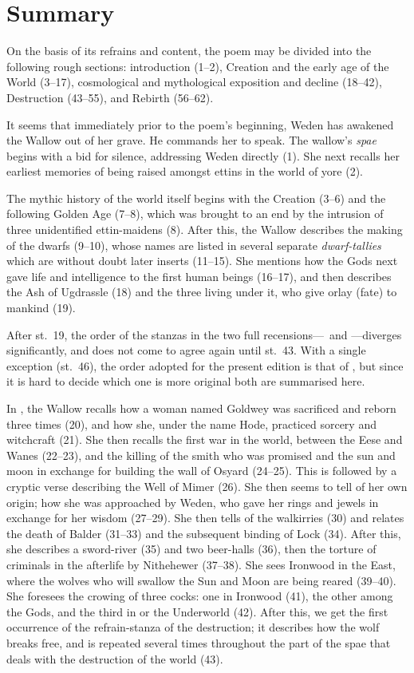 \section{Summary}

On the basis of its refrains and content, the poem may be divided into the following rough sections: introduction (1--2), Creation and the early age of the World (3--17), cosmological and mythological exposition and decline (18--42), Destruction (43--55), and Rebirth (56--62).

It seems that immediately prior to the poem’s beginning, Weden has awakened the Wallow out of her grave.  He commands her to speak.  The wallow’s \emph{spae} begins with a bid for silence, addressing Weden directly (1).  She next recalls her earliest memories of being raised amongst ettins in the world of yore (2).

The mythic history of the world itself begins with the Creation (3--6) and the following Golden Age (7--8), which was brought to an end by the intrusion of three unidentified ettin-maidens (8).  After this, the Wallow describes the making of the dwarfs (9--10), whose names are listed in several separate \emph{dwarf-tallies} which are without doubt later inserts (11--15).  She mentions how the Gods next gave life and intelligence to the first human beings (16--17), and then describes the Ash of Ugdrassle (18) and the three  living under it, who give orlay (fate) to mankind (19).

After st.~19, the order of the stanzas in the two full recensions---\Regius\ and \Hauksbok---diverges significantly, and does not come to agree again until st.~43.  With a single exception (st.~46), the order adopted for the present edition is that of \Regius, but since it is hard to decide which one is more original both are summarised here.

In \Regius, the Wallow recalls how a woman named Goldwey was sacrificed and reborn three times (20), and how she, under the name Hode, practiced sorcery and witchcraft (21).  She then recalls the first war in the world, between the Eese and Wanes (22--23), and the killing of the smith who was promised  and the sun and moon in exchange for building the wall of Osyard (24--25).  This is followed by a cryptic verse describing the Well of Mimer (26).  She then seems to tell of her own origin; how she was approached by Weden, who gave her rings and jewels in exchange for her wisdom (27--29).  She then tells of the walkirries (30) and relates the death of Balder (31--33) and the subsequent binding of Lock (34).  After this, she describes a sword-river (35) and two beer-halls (36), then the torture of criminals in the afterlife by Nithehewer (37--38).  She sees Ironwood in the East, where the wolves who will swallow the Sun and Moon are being reared (39--40).  She foresees the crowing of three cocks: one in Ironwood (41), the other among the Gods, and the third in  or the Underworld (42).  After this, we get the first occurrence of the refrain-stanza of the destruction; it describes how the wolf breaks free, and is repeated several times throughout the part of the spae that deals with the destruction of the world (43).

